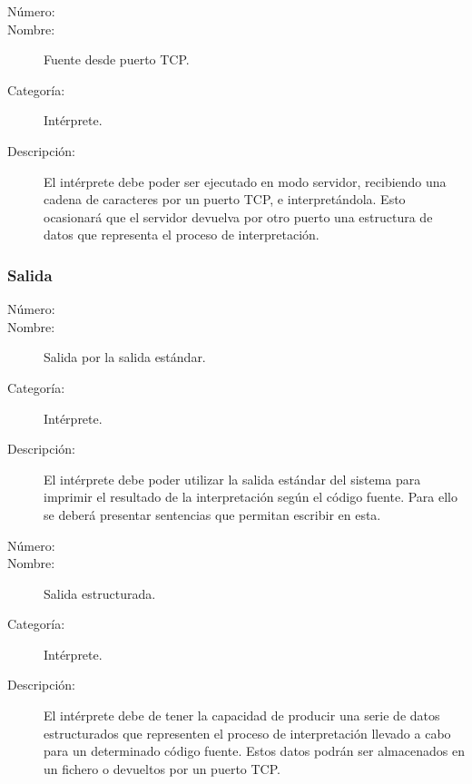 	\begin{description}
		\item [Número:] \cn
		\item [Nombre:] Fuente desde puerto TCP.
		\item [Categoría:] Intérprete.
		\item [Descripción:] El intérprete debe poder ser ejecutado en modo servidor, recibiendo una cadena de caracteres por un puerto TCP, e interpretándola. Esto ocasionará que el 
servidor devuelva por otro puerto una estructura de datos que representa el proceso de interpretación. 
	\end {description}

\subsubsection{Salida}

	\begin{description}
		\item [Número:] \cn
		\item [Nombre:] Salida por la salida estándar.
		\item [Categoría:] Intérprete.
		\item [Descripción:] El intérprete debe poder utilizar la salida estándar del sistema
para imprimir el resultado de la interpretación según el código fuente. Para ello se deberá presentar
sentencias que permitan escribir en esta.
	\end {description}

	\begin{description}
		\item [Número:] \cn
		\item [Nombre:] Salida estructurada.
		\item [Categoría:] Intérprete.
		\item [Descripción:] El intérprete debe de tener la capacidad de producir una serie 
de datos estructurados que representen el proceso de interpretación llevado a cabo para un determinado código fuente. Estos datos podrán ser almacenados en un fichero o devueltos por 
un puerto TCP.
	\end {description}

